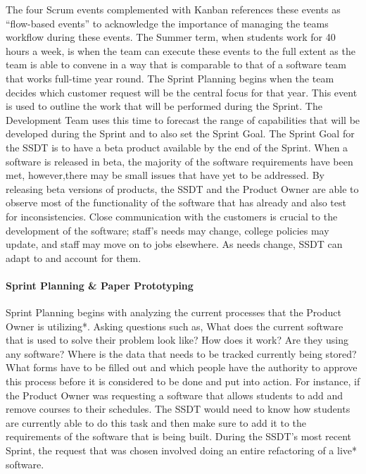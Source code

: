 The four Scrum events complemented with Kanban references these events as ``flow-based events'' to acknowledge the importance of managing the teams workflow during these events. The Summer term, when students work for 40 hours a week, is when the team can execute these events to the full extent as the team is able to convene in a way that is comparable to that of a software team that works full-time year round. The Sprint Planning begins when the team decides which customer request will be the central focus for that year. This event is used to outline the work that will be performed during the Sprint. The Development Team uses this time to forecast the range of capabilities that will be developed during the Sprint and to also set the Sprint Goal. The Sprint Goal for the SSDT is to have a beta product available by the end of the Sprint. When a software is released in beta, the majority of the software requirements have been met, however,there may be small issues that have yet to be addressed. By releasing beta versions of products, the SSDT and the Product Owner are able to observe most of the functionality of the software that has already and also test for inconsistencies. Close communication with the customers is crucial to the development of the software; staff's needs may change, college policies may update, and staff may move on to jobs elsewhere. As needs change, SSDT can adapt to and account for them.



\paragraph{Sprint Planning \& Paper Prototyping}
Sprint Planning begins with analyzing the current processes that the Product Owner is utilizing*. Asking questions such as, What does the current software that is used to solve their problem look like? How does it work? Are they using any software? Where is the data that needs to be tracked currently being stored? What forms have to be filled out and which people have the authority to approve this process before it is considered to be done and put into action. For instance, if the Product Owner was requesting a software that allows students to add and remove courses to their schedules. The SSDT would need to know how students are currently able to do this task and then make sure to add it to the requirements of the software that is being built. During the SSDT's most recent Sprint, the request that was chosen involved doing an entire refactoring of a live* software.

